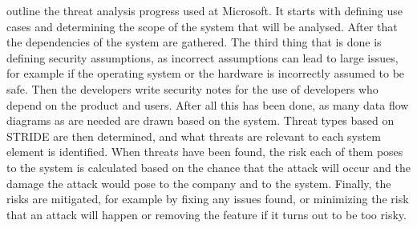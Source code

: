 
\citet{microsoft_security_lifecycle} outline the threat analysis progress used at Microsoft.
It starts with defining use cases and determining the scope of the system that will be analysed. 
After that the dependencies of the system are gathered.
The third thing that is done is defining security assumptions, as incorrect assumptions can lead to large issues, for example if the operating system or the hardware is incorrectly assumed to be safe.
Then the developers write security notes for the use of developers who depend on the product and users.
After all this has been done, as many data flow diagrams as are needed are drawn based on the system.
Threat types based on STRIDE are then determined, and what threats are relevant to each system element is identified.
When threats have been found, the risk each of them poses to the system is calculated based on the chance that the attack will occur and the damage the attack would pose to the company and to the system.
Finally, the risks are mitigated, for example by fixing any issues found, or minimizing the risk that an attack will happen or removing the feature if it turns out to be too risky. 

